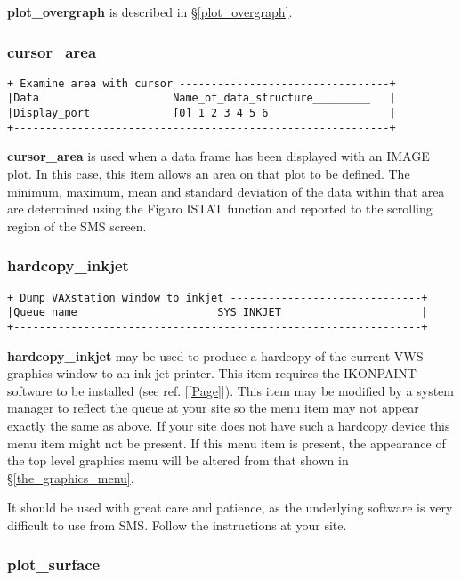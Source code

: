 {{\bf plot\_overgraph} is described in \S \ref{plot_overgraph}.

\subsubsection{cursor\_area}
\begin{verbatim}
+ Examine area with cursor ---------------------------------+
|Data                     Name_of_data_structure_________   |
|Display_port             [0] 1 2 3 4 5 6                   |
+-----------------------------------------------------------+
\end{verbatim}

{\bf cursor\_area} is used when a data frame has been displayed with an 
IMAGE plot. In this case, this item allows an area on that plot to be defined.
The minimum, maximum, mean and standard deviation of the data within 
that area are determined using the Figaro ISTAT function and reported to
the scrolling region of the SMS screen.

\subsubsection{hardcopy\_inkjet}
\begin{verbatim}
+ Dump VAXstation window to inkjet ------------------------------+
|Queue_name                      SYS_INKJET                      |
+----------------------------------------------------------------+
\end{verbatim}

{\bf hardcopy\_inkjet} may be used to produce a hardcopy of 
the current VWS graphics window to an ink-jet printer. This item
requires the IKONPAINT software to be installed (see ref. [\ref{Page}]).
This item may be modified by a system manager to reflect the queue at your
site so the menu item may not appear exactly the same as above.
If your site does not have such a hardcopy device this menu item might
not be present. If this menu item is present, the appearance of the
top level graphics menu will be altered from that shown in 
\S \ref{the_graphics_menu}.

It should be used with great care and patience, as the underlying 
software is very difficult to use from SMS. Follow the instructions 
at your site. 

\subsubsection{plot\_surface}

}
